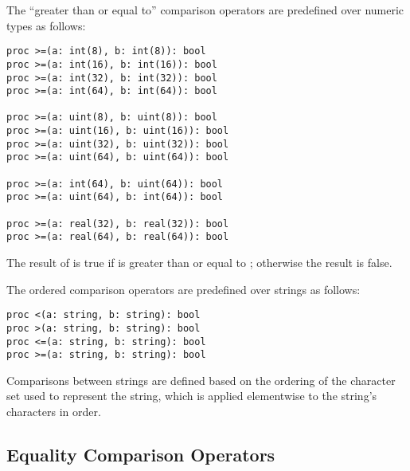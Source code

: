 The ``greater than or equal to'' comparison operators are predefined
over numeric types as follows:
\begin{chapel}
\begin{verbatim}
proc >=(a: int(8), b: int(8)): bool
proc >=(a: int(16), b: int(16)): bool
proc >=(a: int(32), b: int(32)): bool
proc >=(a: int(64), b: int(64)): bool

proc >=(a: uint(8), b: uint(8)): bool
proc >=(a: uint(16), b: uint(16)): bool
proc >=(a: uint(32), b: uint(32)): bool
proc >=(a: uint(64), b: uint(64)): bool

proc >=(a: int(64), b: uint(64)): bool
proc >=(a: uint(64), b: int(64)): bool

proc >=(a: real(32), b: real(32)): bool
proc >=(a: real(64), b: real(64)): bool
\end{verbatim}
\end{chapel}
The result of  is true if  is greater than or
equal to ; otherwise the result is false.

The ordered comparison operators are predefined over strings as follows:
\begin{chapel}
\begin{verbatim}
proc <(a: string, b: string): bool
proc >(a: string, b: string): bool
proc <=(a: string, b: string): bool
proc >=(a: string, b: string): bool
\end{verbatim}
\end{chapel}
Comparisons between strings are defined based on the ordering of the
character set used to represent the string, which is applied
elementwise to the string's characters in order.


\subsection{Equality Comparison Operators}
\label{Equality_Comparison_Operators}


